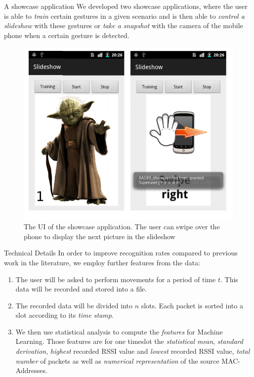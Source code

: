 \documentclass[final,hyperref={pdfpagelabels=false}]{beamer}
\begin{document}
\begin{frame}[t]
\begin{columns}[t]
\begin{column}{.465\textwidth}
\begin{block}{A showcase application}
We developed two showcase applications, where the user is able to \emph{train} certain gestures in a given scenario and is then able to \emph{control a slideshow} with these gestures or \emph{take a snapshot} with the camera of the mobile phone when a certain gesture is detected.
\begin{figure}
\includegraphics[width=0.9\linewidth]{./pics/showcaseApp.png}
\caption{The UI of the showcase application. The user can swipe over the phone to display the next picture in the slideshow}
\label{fig:ushahidi}
\end{figure}
\end{block}



\begin{block}{Technical Details}
In order to improve recognition rates compared to previous work in the literature, we employ further features from the data:
\begin{enumerate}
\item The user will be asked to perform movements for a period of time $t$. 
This data will be recorded and stored into a file.
\item The recorded data will be divided into $n$ slots. 
Each packet is sorted into a slot according to its \emph{time stamp}.
\item We then use statistical analysis to compute the \emph{features} for Machine Learning. 
Those features are for one timeslot the \emph{statistical mean}, \emph{standard derivation}, \emph{highest} recorded RSSI value and \emph{lowest} recorded RSSI value, \emph{total number} of packets as well as \emph{numerical representation} of the source MAC-Addresses.


\end{enumerate}
\end{block}
\end{column}
\end{columns}
\end{frame}
\end{document}

